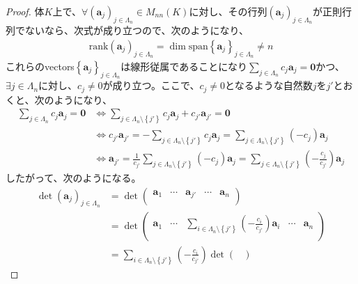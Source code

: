 \documentclass[dvipdfmx]{jsarticle}
\begin{document}
\begin{proof}
体$K$上で、$\forall\left( \mathbf{a}_{j} \right)_{j \in \varLambda_{n}} \in M_{nn}(K)$に対し、その行列$\left( \mathbf{a}_{j} \right)_{j \in \varLambda_{n}}$が正則行列でないなら、次式が成り立つので、次のようになり、
\begin{align*}
{\mathrm{rank}}\left( \mathbf{a}_{j} \right)_{j \in \varLambda_{n}} = \dim{{\mathrm{span}}\left\{ \mathbf{a}_{j} \right\}_{j \in \varLambda_{n}}} \neq n
\end{align*}
これらのvectors$\left\{ \mathbf{a}_{j} \right\}_{j\in \varLambda_n } $は線形従属であることになり$\sum_{j \in \varLambda_{n}} {c_{j}\mathbf{a}_{j}} = \mathbf{0}$かつ、$\exists j \in \varLambda_{n}$に対し、$c_{j} \neq 0$が成り立つ。ここで、$c_{j} \neq 0$となるような自然数$j$を$j'$とおくと、次のようになり、
\begin{align*}
\sum_{j \in \varLambda_{n}} {c_{j}\mathbf{a}_{j}} = \mathbf{0} &\Leftrightarrow \sum_{j \in \varLambda_{n} \setminus \left\{ j' \right\}} {c_{j}\mathbf{a}_{j}} + c_{j'}\mathbf{a}_{j'} = \mathbf{0}\\
&\Leftrightarrow c_{j'}\mathbf{a}_{j'} = - \sum_{j \in \varLambda_{n} \setminus \left\{ j' \right\}} {c_{j}\mathbf{a}_{j}} = \sum_{j \in \varLambda_{n} \setminus \left\{ j' \right\}} {\left( - c_{j} \right)\mathbf{a}_{j}}\\
&\Leftrightarrow \mathbf{a}_{j'} = \frac{1}{c_{j'}}\sum_{j \in \varLambda_{n} \setminus \left\{ j' \right\}} {\left( - c_{j} \right)\mathbf{a}_{j}} = \sum_{j \in \varLambda_{n} \setminus \left\{ j' \right\}} {\left( - \frac{c_{j}}{c_{j'}} \right)\mathbf{a}_{j}}
\end{align*}
したがって、次のようになる。
\begin{align*}
\det\left( \mathbf{a}_{j} \right)_{j \in \varLambda_{n}} &= \det\begin{pmatrix}
\mathbf{a}_{1} & \cdots & \mathbf{a}_{j'} & \cdots & \mathbf{a}_{n} \\
\end{pmatrix}\\
&= \det\begin{pmatrix}
\mathbf{a}_{1} & \cdots & \sum_{i \in \varLambda_{n} \setminus \left\{ j' \right\}} {\left( - \frac{c_{i}}{c_{j'}} \right)\mathbf{a}_{i}} & \cdots & \mathbf{a}_{n} \\
\end{pmatrix}\\
&= \sum_{i \in \varLambda_{n} \setminus \left\{ j' \right\}} {\left( - \frac{c_{i}}{c_{j'}} \right)\det\begin{pmatrix}

\end{pmatrix}}
\end{align*}
\end{proof}
\end{document}
